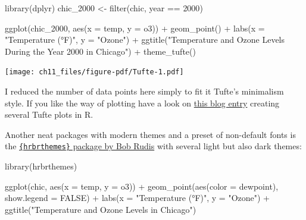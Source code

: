 \documentclass[
  letterpaper,
]{scrbook}
\newenvironment{Shaded}{\begin{snugshade}}{\end{snugshade}}
\newcommand{\AttributeTok}[1]{\textcolor[rgb]{0.40,0.45,0.13}{#1}}
\newcommand{\ConstantTok}[1]{\textcolor[rgb]{0.56,0.35,0.01}{#1}}
\newcommand{\DecValTok}[1]{\textcolor[rgb]{0.68,0.00,0.00}{#1}}
\newcommand{\FunctionTok}[1]{\textcolor[rgb]{0.28,0.35,0.67}{#1}}
\newcommand{\NormalTok}[1]{\textcolor[rgb]{0.00,0.23,0.31}{#1}}
\newcommand{\OtherTok}[1]{\textcolor[rgb]{0.00,0.23,0.31}{#1}}
\newcommand{\SpecialCharTok}[1]{\textcolor[rgb]{0.37,0.37,0.37}{#1}}
\newcommand{\StringTok}[1]{\textcolor[rgb]{0.13,0.47,0.30}{#1}}
\begin{document}
\begin{Shaded}
\begin{Highlighting}[]
\FunctionTok{library}\NormalTok{(dplyr)}
\NormalTok{chic\_2000 }\OtherTok{\textless{}{-}} \FunctionTok{filter}\NormalTok{(chic, year }\SpecialCharTok{==} \DecValTok{2000}\NormalTok{)}

\FunctionTok{ggplot}\NormalTok{(chic\_2000, }\FunctionTok{aes}\NormalTok{(}\AttributeTok{x =}\NormalTok{ temp, }\AttributeTok{y =}\NormalTok{ o3)) }\SpecialCharTok{+}
  \FunctionTok{geom\_point}\NormalTok{() }\SpecialCharTok{+}
  \FunctionTok{labs}\NormalTok{(}\AttributeTok{x =} \StringTok{"Temperature (°F)"}\NormalTok{, }\AttributeTok{y =} \StringTok{"Ozone"}\NormalTok{) }\SpecialCharTok{+}
  \FunctionTok{ggtitle}\NormalTok{(}\StringTok{"Temperature and Ozone Levels During the Year 2000 in Chicago"}\NormalTok{) }\SpecialCharTok{+}
  \FunctionTok{theme\_tufte}\NormalTok{()}
\end{Highlighting}
\end{Shaded}

\texttt{[image: ch11\_files/figure-pdf/Tufte-1.pdf]}

I reduced the number of data points here simply to fit it Tufte's
minimalism style. If you like the way of plotting have a look on
\href{http://motioninsocial.com/tufte/}{this blog entry} creating
several Tufte plots in R.

Another neat packages with modern themes and a preset of non-default
fonts is the
\href{https://github.com/hrbrmstr/hrbrthemes}{\texttt{\{hrbrthemes\}}
package by Bob Rudis} with several light but also dark themes:

\begin{Shaded}
\begin{Highlighting}[]
\FunctionTok{library}\NormalTok{(hrbrthemes)}

\FunctionTok{ggplot}\NormalTok{(chic, }\FunctionTok{aes}\NormalTok{(}\AttributeTok{x =}\NormalTok{ temp, }\AttributeTok{y =}\NormalTok{ o3)) }\SpecialCharTok{+}
  \FunctionTok{geom\_point}\NormalTok{(}\FunctionTok{aes}\NormalTok{(}\AttributeTok{color =}\NormalTok{ dewpoint), }\AttributeTok{show.legend =} \ConstantTok{FALSE}\NormalTok{) }\SpecialCharTok{+}
  \FunctionTok{labs}\NormalTok{(}\AttributeTok{x =} \StringTok{"Temperature (°F)"}\NormalTok{, }\AttributeTok{y =} \StringTok{"Ozone"}\NormalTok{) }\SpecialCharTok{+}
  \FunctionTok{ggtitle}\NormalTok{(}\StringTok{"Temperature and Ozone Levels in Chicago"}\NormalTok{)}
\end{Highlighting}
\end{Shaded}
\end{document}
